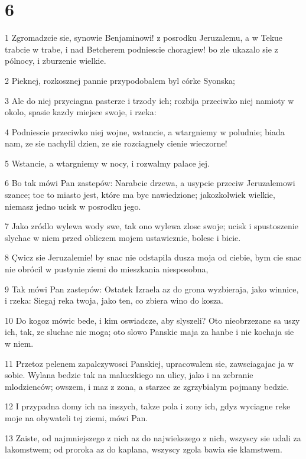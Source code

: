 \chapter{6}

\par 1 Zgromadzcie sie, synowie Benjaminowi! z posrodku Jeruzalemu, a w Tekue trabcie w trabe, i nad Betcherem podniescie choragiew! bo zle ukazalo sie z pólnocy, i zburzenie wielkie.
\par 2 Pieknej, rozkosznej pannie przypodobalem byl córke Syonska;
\par 3 Ale do niej przyciagna pasterze i trzody ich; rozbija przeciwko niej namioty w okolo, spasie kazdy miejsce swoje, i rzeka:
\par 4 Podniescie przeciwko niej wojne, wstancie, a wtargniemy w poludnie; biada nam, ze sie nachylil dzien, ze sie rozciagnely cienie wieczorne!
\par 5 Wstancie, a wtargniemy w nocy, i rozwalmy palace jej.
\par 6 Bo tak mówi Pan zastepów: Narabcie drzewa, a usypcie przeciw Jeruzalemowi szance; toc to miasto jest, które ma byc nawiedzione; jakozkolwiek wielkie, niemasz jedno ucisk w posrodku jego.
\par 7 Jako zródlo wylewa wody swe, tak ono wylewa zlosc swoje; ucisk i spustoszenie slychac w niem przed obliczem mojem ustawicznie, bolesc i bicie.
\par 8 Çwicz sie Jeruzalemie! by snac nie odstapila dusza moja od ciebie, bym cie snac nie obrócil w pustynie ziemi do mieszkania niesposobna,
\par 9 Tak mówi Pan zastepów: Ostatek Izraela az do grona wyzbieraja, jako winnice, i rzeka: Siegaj reka twoja, jako ten, co zbiera wino do kosza.
\par 10 Do kogoz mówic bede, i kim oswiadcze, aby slyszeli? Oto nieobrzezane sa uszy ich, tak, ze sluchac nie moga; oto slowo Panskie maja za hanbe i nie kochaja sie w niem.
\par 11 Przetoz pelenem zapalczywosci Panskiej, upracowalem sie, zawsciagajac ja w sobie. Wylana bedzie tak na maluczkiego na ulicy, jako i na zebranie mlodzienców; owszem, i maz z zona, a starzec ze zgrzybialym pojmany bedzie.
\par 12 I przypadna domy ich na inszych, takze pola i zony ich, gdyz wyciagne reke moje na obywateli tej ziemi, mówi Pan.
\par 13 Zaiste, od najmniejszego z nich az do najwiekszego z nich, wszyscy sie udali za lakomstwem; od proroka az do kaplana, wszyscy zgola bawia sie klamstwem.

